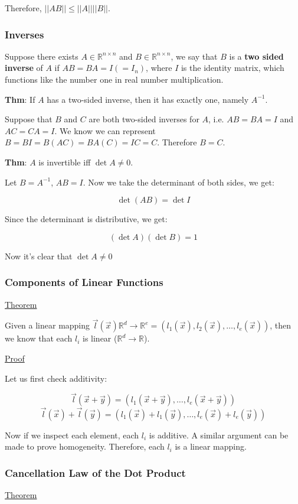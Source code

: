 \documentclass[11 pt, twoside]{article}
\begin{document}
Therefore, $||AB|| \leq ||A|| ||B||$.

\subsubsection{Inverses}

Suppose there exists $A \in \mathbb{R}^{n \times n}$ and $B \in
\mathbb{R}^{n \times n}$, we say that $B$ is a \textbf{two sided inverse} of
$A$ if $AB = BA = I (= I_n)$, where $I$ is the identity matrix, which functions
like the number one in real number multiplication.

\textbf{Thm}: If $A$ has a two-sided inverse, then it has exactly one, namely
$A^{-1}$.

Suppose that $B$ and $C$ are both two-sided inverses for $A$, i.e. $AB = BA = I$
and $AC = CA = I$. We know we can represent $B = BI = B(AC) = BA(C) = IC = C$.
Therefore $B = C$.

\textbf{Thm}: $A$ is invertible iff $\det A \neq 0$.

Let $B = A^{-1}$, $AB = I$. Now we take the determinant of both sides, we get:

$$\det (AB) = \det I$$

Since the determinant is distributive, we get:

$$(\det A)(\det B) = 1$$

Now it's clear that $\det A \neq 0$

\subsubsection{Components of Linear Functions}
\underline{Theorem}

Given a linear mapping $\vec{l}(\vec{x}) \mathbb{R}^d \to \mathbb{R}^e = (l_1(\vec{x}), l_2(\vec{x}),
\dots, l_e(\vec{x}))$, then we know that each $l_i$ is linear ($\mathbb{R}^d
\to \mathbb{R}$).

\underline{Proof}

Let us first check additivity:

\[
\vec{l}(\vec{x} + \vec{y}) = (l_1(\vec{x} + \vec{y}), \dots, l_e(\vec{x} +
\vec{y}))
\]
\[
\vec{l}(\vec{x}) + \vec{l}(\vec{y}) = (l_1(\vec{x}) + l_1(\vec{y}), \dots,
l_e(\vec{x}) + l_e(\vec{y}))
\]

Now if we inspect each element, each $l_i$ is additive. A similar argument can
be made to prove homogeneity. Therefore, each $l_i$ is a linear mapping.

\subsubsection{Cancellation Law of the Dot Product}
\underline{Theorem}
\end{document}
